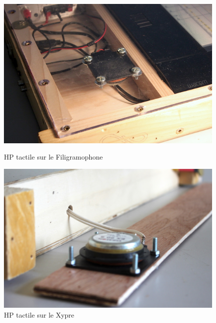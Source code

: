 \begin{figure}[!htbp]
	\captionsetup{format=plain}%
	\centering
	\begin{minipage}[t]{0.48\textwidth}
		\includegraphics[width=\linewidth]{gfx/05_interfaces/filigramophone_hp_72dpi.jpg}
		\caption{HP tactile sur le Filigramophone}
		\label{fig:interface:filigramophone-hp}
	\end{minipage}
	\hspace{.02\linewidth}
	\begin{minipage}[t]{0.48\textwidth}
	    \includegraphics[width=\linewidth]{gfx/05_interfaces/Xypre_HP_144dpi.jpg}
		\caption{HP tactile sur le Xypre}
		\label{fig:interface:xypre_v2-hp}
	\end{minipage}
\end{figure}

